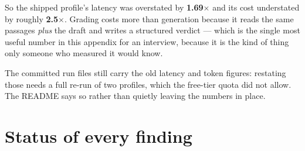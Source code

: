 So the shipped profile's latency was overstated by \textbf{1.69$\times$} and its cost understated by roughly \textbf{2.5$\times$}. Grading costs more than generation because it reads the same passages \emph{plus} the draft and writes a structured verdict --- which is the single most useful number in this appendix for an interview, because it is the kind of thing only someone who measured it would know.

The committed run files still carry the old latency and token figures: restating those needs a full re-run of two profiles, which the free-tier quota did not allow. The README says so rather than quietly leaving the numbers in place.

\section{Status of every finding}

